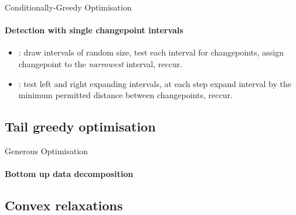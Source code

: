 \documentclass{beamer}
\begin{document}
\begin{frame}{Conditionally-Greedy Optimisation}
\framesubtitle{Detection with single changepoint intervals}

\begin{itemize}
    \item \cite{baranowski2019narrowest}: draw intervals of random size, test each interval for changepoints, assign changepoint to the \textit{narrowest} interval, reccur. 
    \bigskip
    \item \cite{anastasiou2019detecting}: test left and right expanding intervals, at each step expand interval by the minimum permitted distance between changepoints, reccur.
\end{itemize}
    
\end{frame}



\subsection{Tail greedy optimisation}




\begin{frame}{Generous Optimisation}
\framesubtitle{Bottom up data decomposition}

\begin{figure}[h]
	\centering
\end{figure}

\end{frame}



\subsection{Convex relaxations}



\end{document}
